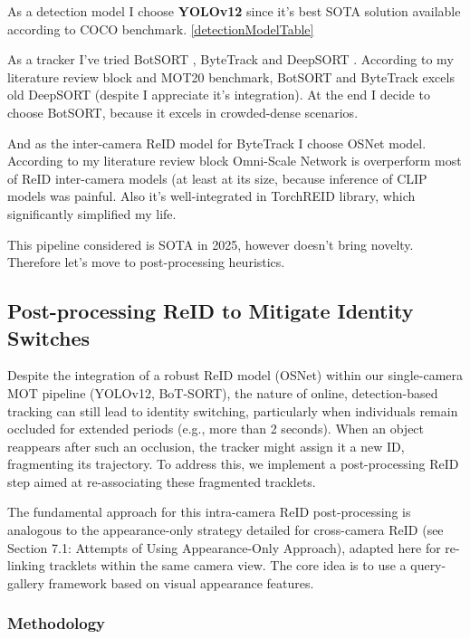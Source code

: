 \documentclass[12pt, a4paper]{article}
\begin{document}
As a detection model I choose \textbf{YOLOv12} since it’s best SOTA solution available according to COCO benchmark. \ref{detectionModelTable} 

As a tracker I’ve tried BotSORT \cite{BoTsort}, ByteTrack \cite{ByteTrack} and DeepSORT \cite{DeepSORT}. According to my literature review block and MOT20 benchmark, BotSORT and ByteTrack excels old DeepSORT (despite I appreciate it’s integration). At the end I decide to choose BotSORT, because it excels in crowded-dense scenarios. 

And as the inter-camera ReID model for ByteTrack I choose OSNet model. According to my literature review block Omni-Scale Network is overperform most of ReID inter-camera models (at least at its size, because inference of CLIP models was painful.  Also it's well-integrated in TorchREID library, which significantly simplified my life.

This pipeline considered is SOTA in 2025, however doesn’t bring novelty. Therefore let’s move to post-processing heuristics.







\subsection{Post-processing ReID to Mitigate Identity Switches}

Despite the integration of a robust ReID model (OSNet) within our single-camera MOT pipeline (YOLOv12, BoT-SORT), the nature of online, detection-based tracking can still lead to identity switching, particularly when individuals remain occluded for extended periods (e.g., more than 2 seconds). When an object reappears after such an occlusion, the tracker might assign it a new ID, fragmenting its trajectory. To address this, we implement a post-processing ReID step aimed at re-associating these fragmented tracklets.

The fundamental approach for this intra-camera ReID post-processing is analogous to the appearance-only strategy detailed for cross-camera ReID (see Section 7.1: Attempts of Using Appearance-Only Approach), adapted here for re-linking tracklets within the same camera view. The core idea is to use a query-gallery framework based on visual appearance features.

\subsubsection{Methodology}
\end{document}
